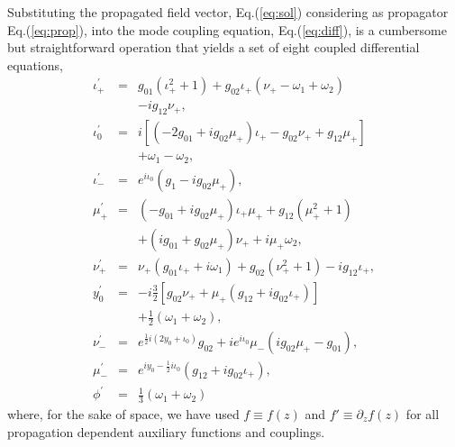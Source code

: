 \documentclass[9pt,twocolumn,twoside]{osajnl}
\begin{document}
Substituting the propagated field vector, Eq.(\ref{eq:sol}) considering as propagator Eq.(\ref{eq:prop}), into the mode coupling equation, Eq.(\ref{eq:diff}), is a cumbersome but straightforward operation that yields a set of eight coupled differential equations,
\begin{eqnarray}
	\iota_{+}^{\prime} &=& g_{01} \left( \iota_{+}^2 + 1 \right) + g_{02}  \iota_{+}  (\nu_{+}-\omega_1+\omega_2)\nonumber\\ &&- i  g_{12}   \nu_{+},    \label{eq:iota} \\
	\iota_{0}^{\prime} &=& i \left[ \left(- 2 g_{01} + i g_{02} \mu_{+}  \right) \iota_{+}  - g_{02} \nu_{+} + g_{12} \mu_{+} \right]\nonumber \\
	&&+ \omega_1 - \omega_2, \\
	\iota_{-}^{\prime} &=& e^{i \iota_0} \left( g_{1} - i g_{02}\mu_{+} \right), \\
	\mu_{+}^{\prime} &=& \left( - g_{01} + i  g_{02} \mu_{+} \right) \iota_{+} \mu_{+}    +  g_{12} \left( \mu_{+}^2 +  1 \right)\nonumber \\
	&&  +  \left( i  g_{01} + g_{02} \mu_{+} \right) \nu_{+}+i \mu_{+}\omega_2,   \\
	\nu_{+}^{\prime} &=& \nu_{+}(g_{01} \iota_{+}
	+i\omega_1) 
	 + g_{02} (  \nu_{+} ^2
	+ 1)-i  g_{12} \iota_{+}, \label{eq:mu} \\
	y_{0}^{\prime} &=& -i\frac{3}{2}  
	[ g_{02}   \nu_{+}+  \mu_{+}  
	( g_{12}+i  g_{02} \iota_{+})]\nonumber \\&&+\frac{1}{2}(\omega_1+\omega_2),  \\
	\nu_{-}^{\prime} &=& e^{\frac{1}{2}i(2y_0+\iota_0)}
	g_{02} +i e^{i\iota_{0}}  \mu_{-}  (i g_{02} 
	 \mu_{+}-  g_{01}),  \\
	\mu_{-}^{\prime} &=&  e^{i y_0-\frac{1}{2}i \iota_0}
	( g_{12}+i  g_{02} \iota_{+}),\\
	\phi ^{\prime} &=& \frac{1}{3}(\omega_1+\omega_2)
\end{eqnarray}
where, for the sake of space, we have used $f \equiv f(z)$ and $f' \equiv \partial_{z} f(z)$ for all propagation dependent auxiliary functions and couplings.
\end{document}
